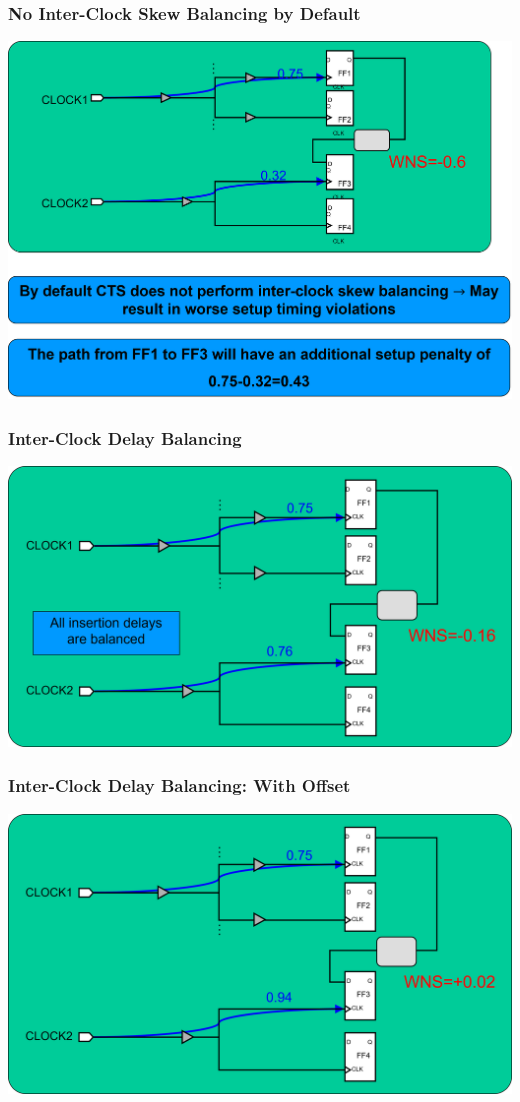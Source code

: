 \documentclass[compress]{beamer}
\begin{document}
\begin{frame}
	\frametitle{No Inter-Clock Skew Balancing by Default}
	\begin{center}
		\includegraphics[width=\textwidth]{Inter-Clock}
	\end{center}
\end{frame}
\begin{frame}
	\frametitle{Inter-Clock Delay Balancing}
	\begin{center}
		\includegraphics[width=\textwidth]{Inter-Clock1}
	\end{center}
\end{frame}
\begin{frame}
	\frametitle{Inter-Clock Delay Balancing: With Offset}
	\begin{center}
		\includegraphics[width=\textwidth]{Inter-Clock2}
	\end{center}
\end{frame}
\end{document}
